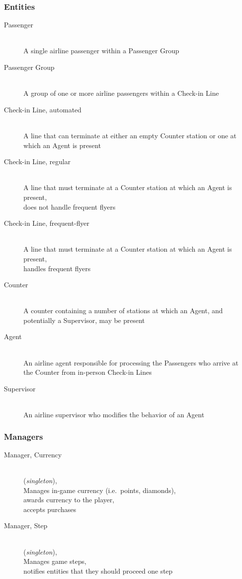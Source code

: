 \documentclass{article}
\begin{document}
\subsubsection{Entities}
\begin{description}
\item[Passenger] \hfill \\
A single airline passenger within a Passenger Group
\item[Passenger Group] \hfill \\
A group of one or more airline passengers within a Check-in Line
\item[Check-in Line, automated] \hfill \\
A line that can terminate at either an empty Counter station
or one at which an Agent is present
\item[Check-in Line, regular] \hfill \\
A line that must terminate at a Counter station at which
an Agent is present,\\does not handle frequent flyers
\item[Check-in Line, frequent-flyer] \hfill \\
A line that must terminate at a Counter station at which
an Agent is present,\\handles frequent flyers
\item[Counter] \hfill \\
A counter containing a number of stations at which
an Agent, and potentially a Supervisor, may be present
\item[Agent] \hfill \\
An airline agent responsible for processing the Passengers
who arrive at the Counter from in-person Check-in Lines
\item[Supervisor] \hfill \\
An airline supervisor who modifies the behavior of an Agent
\end{description}

\subsubsection{Managers}
\begin{description}
\item[Manager, Currency] \hfill \\
(\textit{singleton}),\\
Manages in-game currency (i.e.\ points, diamonds),\\
awards currency to the player,\\accepts purchases
\item[Manager, Step] \hfill \\
(\textit{singleton}),\\Manages game steps,\\
notifies entities that they should proceed one step
\end{description}
\end{document}
